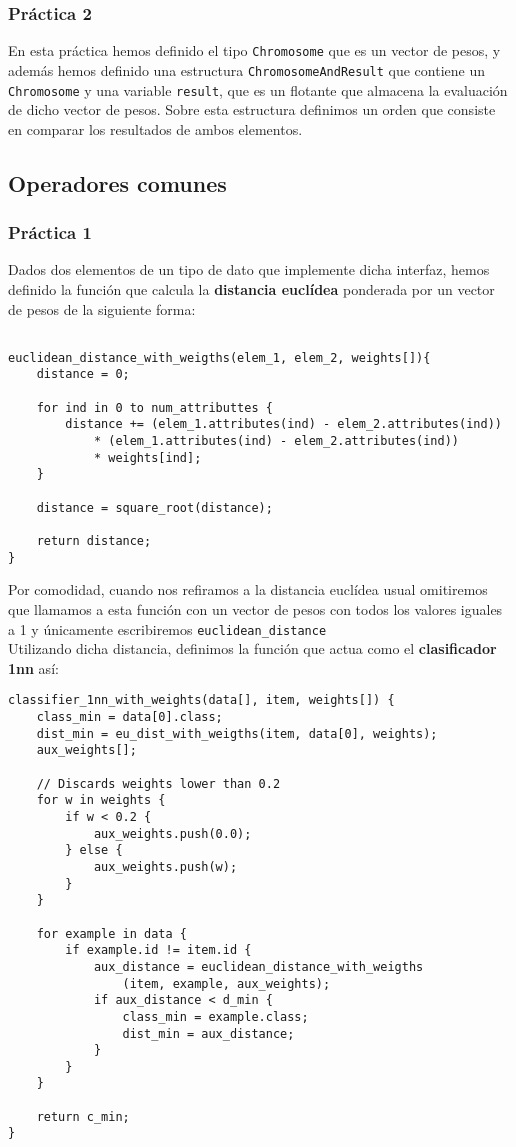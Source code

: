 \documentclass[size=a4, parskip=half, titlepage=false, toc=flat, toc=bib, 12pt]{scrartcl}
\begin{document}
\subsubsection{Práctica 2}
En esta práctica hemos definido el tipo \texttt{Chromosome} que es un vector de pesos, y además hemos definido una estructura \texttt{ChromosomeAndResult} que contiene un \texttt{Chromosome} y una variable \texttt{result}, que es un flotante que almacena la evaluación de dicho vector de pesos. Sobre esta estructura definimos un orden que consiste en comparar los resultados de ambos elementos.
\subsection{Operadores comunes}
\subsubsection{Práctica 1}
Dados dos elementos de un tipo de dato que implemente dicha interfaz, hemos definido la función que calcula la \textbf{distancia euclídea} ponderada por un vector de pesos de la siguiente forma:

\begin{verbatim}

euclidean_distance_with_weigths(elem_1, elem_2, weights[]){
    distance = 0;

    for ind in 0 to num_attributtes {
        distance += (elem_1.attributes(ind) - elem_2.attributes(ind))
            * (elem_1.attributes(ind) - elem_2.attributes(ind))
            * weights[ind];
    }

    distance = square_root(distance);

    return distance;
}

\end{verbatim}
Por comodidad, cuando nos refiramos a la distancia euclídea usual omitiremos que llamamos a esta función con un vector de pesos con todos los valores iguales a 1 y únicamente escribiremos \texttt{euclidean\_distance} \\

Utilizando dicha distancia, definimos la función que actua como el \textbf{clasificador 1nn} así:
\begin{verbatim}
classifier_1nn_with_weights(data[], item, weights[]) {
    class_min = data[0].class;
    dist_min = eu_dist_with_weigths(item, data[0], weights);
    aux_weights[];

    // Discards weights lower than 0.2
    for w in weights {
        if w < 0.2 {
            aux_weights.push(0.0);
        } else {
            aux_weights.push(w);
        }
    }

    for example in data {
        if example.id != item.id {
            aux_distance = euclidean_distance_with_weigths
                (item, example, aux_weights);
            if aux_distance < d_min {
                class_min = example.class;
                dist_min = aux_distance;
            }
        }
    }

    return c_min;
}

\end{verbatim}
\end{document}
